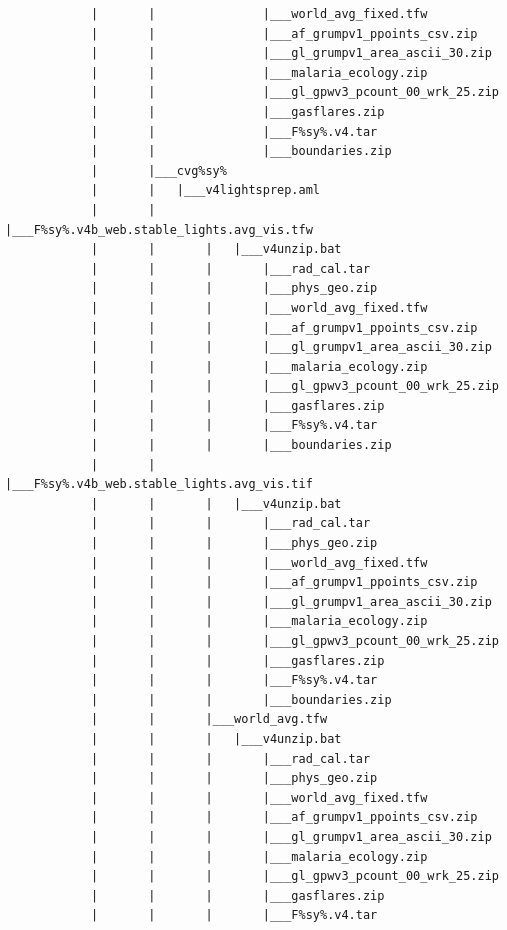 \documentclass[]{book}
\begin{document}
\begin{verbatim}
            |       |               |___world_avg_fixed.tfw
            |       |               |___af_grumpv1_ppoints_csv.zip
            |       |               |___gl_grumpv1_area_ascii_30.zip
            |       |               |___malaria_ecology.zip
            |       |               |___gl_gpwv3_pcount_00_wrk_25.zip
            |       |               |___gasflares.zip
            |       |               |___F%sy%.v4.tar
            |       |               |___boundaries.zip
            |       |___cvg%sy%
            |       |   |___v4lightsprep.aml
            |       |       |___F%sy%.v4b_web.stable_lights.avg_vis.tfw
            |       |       |   |___v4unzip.bat
            |       |       |       |___rad_cal.tar
            |       |       |       |___phys_geo.zip
            |       |       |       |___world_avg_fixed.tfw
            |       |       |       |___af_grumpv1_ppoints_csv.zip
            |       |       |       |___gl_grumpv1_area_ascii_30.zip
            |       |       |       |___malaria_ecology.zip
            |       |       |       |___gl_gpwv3_pcount_00_wrk_25.zip
            |       |       |       |___gasflares.zip
            |       |       |       |___F%sy%.v4.tar
            |       |       |       |___boundaries.zip
            |       |       |___F%sy%.v4b_web.stable_lights.avg_vis.tif
            |       |       |   |___v4unzip.bat
            |       |       |       |___rad_cal.tar
            |       |       |       |___phys_geo.zip
            |       |       |       |___world_avg_fixed.tfw
            |       |       |       |___af_grumpv1_ppoints_csv.zip
            |       |       |       |___gl_grumpv1_area_ascii_30.zip
            |       |       |       |___malaria_ecology.zip
            |       |       |       |___gl_gpwv3_pcount_00_wrk_25.zip
            |       |       |       |___gasflares.zip
            |       |       |       |___F%sy%.v4.tar
            |       |       |       |___boundaries.zip
            |       |       |___world_avg.tfw
            |       |       |   |___v4unzip.bat
            |       |       |       |___rad_cal.tar
            |       |       |       |___phys_geo.zip
            |       |       |       |___world_avg_fixed.tfw
            |       |       |       |___af_grumpv1_ppoints_csv.zip
            |       |       |       |___gl_grumpv1_area_ascii_30.zip
            |       |       |       |___malaria_ecology.zip
            |       |       |       |___gl_gpwv3_pcount_00_wrk_25.zip
            |       |       |       |___gasflares.zip
            |       |       |       |___F%sy%.v4.tar

\end{verbatim}
\end{document}
